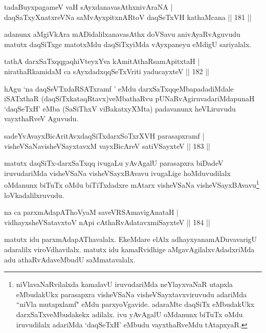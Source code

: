\vskip 5pt
\begin{shl}
tadaBuyxpagameV vaH sAyxdanavasAthx\s nivAraNA |\\
daqSaTxyXnatxreVNa saMvAyxpitxnARtoV daqSeTxVH kathaMcana \hfill || 181 ||
\end{shl}
\vskip 5pt
\begin{artha}
adanunx aMgiVkAra mADidalilx\footnotemark[2] anavasAthx doVSavu anivAyaRvAguvudu matutx daqSiTxge matotxMdu daqSiTxyiMda vAyxpaneyu eMdigU sariyalalx.
\end{artha}
\vskip 5pt
\begin{shl}
tathA darxSaTxqqgaqhiVteyxYva kAmitAthaRsamApitxtaH |\\
nirathaRkamidaM ca sAyxdadxqqSeTxVriti yaducayxteV \hfill || 182 ||
\end{shl}
\vskip 5pt
\begin{artha}%
hAgu `na daqSeVTxdaRSATxramf ' eMdu darxSaTxqqeMbapadadiMdale iSATxthaR (daqSiTxkataqRtavx)veMbathaRvu pUNaRvAgiruvadariMda\break punaH `daqSeTxH' eMba (SaSiThxV viBakatxyXMta) padavanunx heVLiruvudu vayxthaRveV Aguvudu.
\end{artha}
\vskip 5pt
\vskip 5pt
\begin{shl}
sadeYvAvayxBicAritAvxdaqSiTxdarxSoTxrXVH parasapxramf |\\
visheVSaNavisheVSayxtavxM vayxBicAreV satiVSayxteV \hfill || 183 ||
\end{shl}
\vskip 5pt
\begin{artha}
matutx daqSiTx-darxSaTxqq ivugaLu yAvAgalU parasapxra biDadeV iruvudariMda visheVSaNa visheVSayxBAvavu ivugaLige hoMduvudilalx oMdanunx biTuTx oMdu biTiTxdadxre mAtarx visheVSaNa visheVSayxBAvavu\footnote{niVlavaNaRvilalxda kamalavU iruvudariMda neYlayxvaNaR utapxla eMbudakUkx parasapxra visheVSaNa visheVSayxtavxviruvudu adariMda ``niVla mutapxlamf" eMdu parxyoVgavide. adaraMte daqSiTx eMbudakUkx darxSaTxveMbudakekx adilalx. ivu yAvAgalU oMdanunx biTuTx oMdu iruvudilalx adariMda `daqSeTxH' eMbudu vayxthaRveMdu tAtapxyaR.} loVkadalilxruvudu.
\end{artha}
\vskip 5pt
\begin{shl}
na ca parxmAdapAThoV\s yaM saveVRSAmavigAnataH |\\
vidhayxsheVSatavxtoV nApi cAthaRvAdatavxmiSayxteV \hfill || 184 ||
\end{shl}	
\vskip 5pt
\begin{artha}
matutx idu parxmAdapAThavalalx. EkeMdare elAlx adhayxyana\break mADuvavarigU adaralilx viroVdhavilalx. matutx idu kamaRvidhige aMgavAgilalxvAdadxriMda adu athaRvAdaveMbudU saMmatavalalx.
\end{artha}
